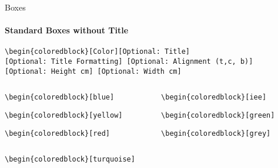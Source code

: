 \documentclass[aspectratio=169]{beamer}
\begin{document}
\begin{frame}{Boxes}
    \framesubtitle{Standard Boxes without Title}

    \vspace{-.8cm}
    \begin{coloredblock}[grey]
        \footnotesize\centering\texttt{\textbackslash begin\{coloredblock\}[Color][Optional:~Title][Optional:~Title~Formatting] [Optional:~Alignment (t,c, b)][Optional:~Height~cm] [Optional:~Width~cm]}
    \end{coloredblock}

    \vspace{-1.1cm}
    \begin{columns}
        \begin{column}{0.49\textwidth}

            \begin{coloredblock}[blue]
                \footnotesize\footnotesize\texttt{\textbackslash begin\{coloredblock\}[blue]}\strut
            \end{coloredblock}
    
            \begin{coloredblock}[yellow]
                \footnotesize\texttt{\textbackslash begin\{coloredblock\}[yellow]}\strut
            \end{coloredblock}
    
            \begin{coloredblock}[red]
                \footnotesize\texttt{\textbackslash begin\{coloredblock\}[red]}\strut
            \end{coloredblock}

        \end{column}
        \begin{column}{0.49\textwidth}
        
            \begin{coloredblock}[iee]
                \footnotesize\texttt{\textbackslash begin\{coloredblock\}[iee]}\strut
            \end{coloredblock}
    
            \begin{coloredblock}[green]
                \footnotesize\texttt{\textbackslash begin\{coloredblock\}[green]}\strut
            \end{coloredblock}
    
            \begin{coloredblock}[grey]
                \footnotesize\texttt{\textbackslash begin\{coloredblock\}[grey]}\strut
            \end{coloredblock}
        
        \end{column}
    \end{columns}

    \centering
    \begin{minipage}[t]{0.49\textwidth}
        \begin{coloredblock}[turquoise]
                \footnotesize\texttt{\textbackslash begin\{coloredblock\}[turquoise]}\strut
        \end{coloredblock}
    \end{minipage}
\end{frame}
\end{document}
